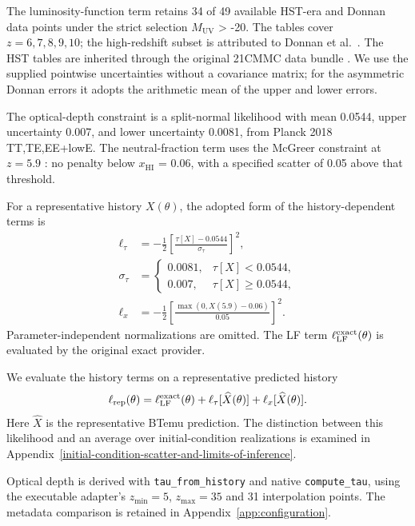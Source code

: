 The luminosity-function term retains 34 of 49 available HST-era and Donnan data points under the strict selection \ensuremath{M_{\mathrm{UV}}} \textgreater{} -20. The tables cover $z=6,7,8,9,10$; the high-redshift subset is attributed to Donnan et al.~\cite{Donnan2024}. The HST tables are inherited through the original 21CMMC data bundle \cite{Greig2015,Park2019}. We use the supplied pointwise uncertainties without a covariance matrix; for the asymmetric Donnan errors it adopts the arithmetic mean of the upper and lower errors.

The optical-depth constraint \cite{Planck2018} is a split-normal likelihood with mean 0.0544, upper uncertainty 0.007, and lower uncertainty 0.0081, from Planck 2018 TT,TE,EE+lowE. The neutral-fraction term uses the McGreer constraint at $z=5.9$ \cite{McGreer2015}: no penalty below \ensuremath{x_{\mathrm{HI}}} = 0.06, with a specified scatter of 0.05 above that threshold.

For a representative history $X(\theta)$, the adopted form of the history-dependent terms is
\begin{align}
\ell_\tau&=-\frac{1}{2}\left[\frac{\tau[X]-0.0544}{\sigma_\tau}\right]^2,\\
\sigma_\tau&=\begin{cases}0.0081,&\tau[X]<0.0544,\\0.007,&\tau[X]\geq0.0544,\end{cases}\\
\ell_x&=-\frac{1}{2}\left[\frac{\max(0,X(5.9)-0.06)}{0.05}\right]^2.
\end{align}
Parameter-independent normalizations are omitted. The LF term $\ell_{\rm LF}^{\rm exact}(\theta)$ is evaluated by the original exact provider.

We evaluate the history terms on a representative predicted history
\begin{equation}
\ell_{\rm rep}(\theta)=\ell_{\rm LF}^{\rm exact}(\theta)
+\ell_\tau[\widehat X(\theta)]+\ell_x[\widehat X(\theta)].
\end{equation}
Here $\widehat X$ is the representative BTemu prediction. The distinction between this likelihood and an average over initial-condition realizations is examined in Appendix~\ref{initial-condition-scatter-and-limits-of-inference}.

Optical depth is derived with \texttt{tau\_from\_history} and native \texttt{compute\_tau}, using the executable adapter's $z_{\min}=5$, $z_{\max}=35$ and 31 interpolation points. The metadata comparison is retained in Appendix~\ref{app:configuration}.

